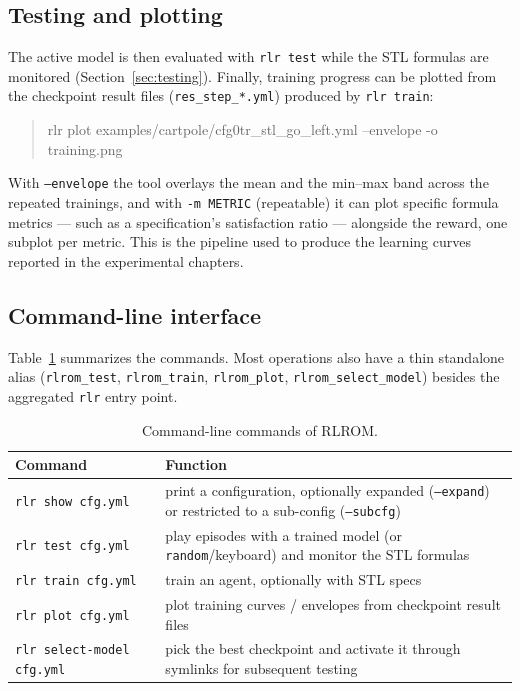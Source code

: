 \subsection{Testing and plotting}
The active model is then evaluated with \texttt{rlr test} while the STL formulas
are monitored (Section~\ref{sec:testing}). Finally, training progress can be plotted
from the checkpoint result files (\texttt{res\_step\_*.yml}) produced by
\texttt{rlr train}:
\begin{quote}\raggedright\ttfamily
rlr plot examples/cartpole/cfg0tr\_stl\_go\_left.yml --envelope -o training.png
\end{quote}
With \texttt{--envelope} the tool overlays the mean and the min--max band across the
repeated trainings, and with \texttt{-m METRIC} (repeatable) it can plot specific
formula metrics --- such as a specification's satisfaction ratio --- alongside the
reward, one subplot per metric. This is the pipeline used to produce the learning
curves reported in the experimental chapters.

\subsection{Command-line interface}
\label{sec:workflow:cli}
Table~\ref{tab:cli} summarizes the commands. Most operations also have a thin
standalone alias (\texttt{rlrom\_test}, \texttt{rlrom\_train},
\texttt{rlrom\_plot}, \texttt{rlrom\_select\_model}) besides the aggregated
\texttt{rlr} entry point.

\begin{table}[htbp]
  \centering
  \caption{Command-line commands of \textsc{RLROM}.}
  \label{tab:cli}
  \small
  \begin{tabular}{@{}llp{9.6cm}@{}}
    \toprule
    \textbf{Command} & & \textbf{Function} \\
    \midrule
    \texttt{rlr show cfg.yml} & & print a configuration, optionally expanded
      (\texttt{--expand}) or restricted to a sub-config (\texttt{--subcfg}) \\
    \texttt{rlr test cfg.yml} & & play episodes with a trained model (or
      \texttt{random}/keyboard) and monitor the STL formulas \\
    \texttt{rlr train cfg.yml} & & train an agent, optionally with STL specs \\
    \texttt{rlr plot cfg.yml} & & plot training curves / envelopes from checkpoint
      result files \\
    \texttt{rlr select-model cfg.yml} & & pick the best checkpoint and activate it
      through symlinks for subsequent testing \\
    \bottomrule
  \end{tabular}
\end{table}
